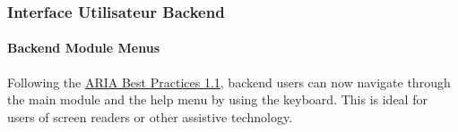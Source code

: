 %

\begin{frame}[fragile]
	\frametitle{Interface Utilisateur Backend}
	\framesubtitle{Backend Module Menus}

	Following the
	\href{https://www.w3.org/TR/wai-aria-practices-1.1/}{ARIA Best Practices 1.1},
	backend users can now navigate through the main module and the help menu by
	using the keyboard. This is ideal for users of screen readers or other
	assistive technology.


\end{frame}

